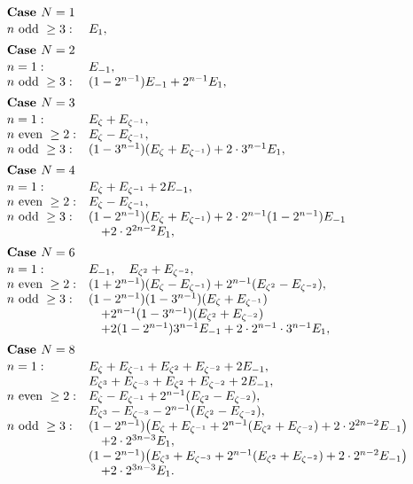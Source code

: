 \documentclass[10pt,a4paper]{article}
\theoremstyle{deligne}
\begin{document}
\[
\begin{array}{ll}
\multicolumn{2}{l}{\textbf{Case }N=1}\\[0.15em]
n\hbox{ odd }\ge3: & E_1,\\[0.5em]
\multicolumn{2}{l}{\textbf{Case }N=2}\\[0.15em]
n=1: & E_{-1},\\
n\hbox{ odd }\ge3: & (1-2^{n-1})E_{-1}+2^{n-1}E_1,\\[0.5em]
\multicolumn{2}{l}{\textbf{Case }N=3}\\[0.15em]
n=1: & E_\zeta+E_{\zeta^{-1}},\\
n\hbox{ even }\ge2: & E_\zeta-E_{\zeta^{-1}},\\
n\hbox{ odd }\ge3: & (1-3^{n-1})(E_\zeta+E_{\zeta^{-1}})+2\cdot3^{n-1}E_1,\\[0.5em]
\multicolumn{2}{l}{\textbf{Case }N=4}\\[0.15em]
n=1: & E_\zeta+E_{\zeta^{-1}}+2E_{-1},\\
n\hbox{ even }\ge2: & E_\zeta-E_{\zeta^{-1}},\\
n\hbox{ odd }\ge3: & (1-2^{n-1})(E_\zeta+E_{\zeta^{-1}})+2\cdot2^{n-1}(1-2^{n-1})E_{-1}\\
&\quad +2\cdot2^{2n-2}E_1,\\[0.5em]
\multicolumn{2}{l}{\textbf{Case }N=6}\\[0.15em]
n=1: & E_{-1},\quad E_{\zeta^2}+E_{\zeta^{-2}},\\
n\hbox{ even }\ge2: & (1+2^{n-1})(E_\zeta-E_{\zeta^{-1}})+2^{n-1}(E_{\zeta^2}-E_{\zeta^{-2}}),\\
n\hbox{ odd }\ge3: & (1-2^{n-1})(1-3^{n-1})(E_\zeta+E_{\zeta^{-1}})\\
&\quad +2^{n-1}(1-3^{n-1})(E_{\zeta^2}+E_{\zeta^{-2}})\\
&\quad +2(1-2^{n-1})3^{n-1}E_{-1}+2\cdot2^{n-1}\cdot3^{n-1}E_1,\\[0.5em]
\multicolumn{2}{l}{\textbf{Case }N=8}\\[0.15em]
n=1: & E_\zeta+E_{\zeta^{-1}}+E_{\zeta^2}+E_{\zeta^{-2}}+2E_{-1},\\
& E_{\zeta^3}+E_{\zeta^{-3}}+E_{\zeta^2}+E_{\zeta^{-2}}+2E_{-1},\\
n\hbox{ even }\ge2: & E_\zeta-E_{\zeta^{-1}}+2^{n-1}(E_{\zeta^2}-E_{\zeta^{-2}}),\\
& E_{\zeta^3}-E_{\zeta^{-3}}-2^{n-1}(E_{\zeta^2}-E_{\zeta^{-2}}),\\
n\hbox{ odd }\ge3: & (1-2^{n-1})\bigl(E_\zeta+E_{\zeta^{-1}}+2^{n-1}(E_{\zeta^2}+E_{\zeta^{-2}})+2\cdot2^{2n-2}E_{-1}\bigr)\\
&\quad +2\cdot2^{3n-3}E_1,\\
& (1-2^{n-1})\bigl(E_{\zeta^3}+E_{\zeta^{-3}}+2^{n-1}(E_{\zeta^2}+E_{\zeta^{-2}})+2\cdot2^{n-2}E_{-1}\bigr)\\
&\quad +2\cdot2^{3n-3}E_1.
\end{array}
\]
\end{document}
